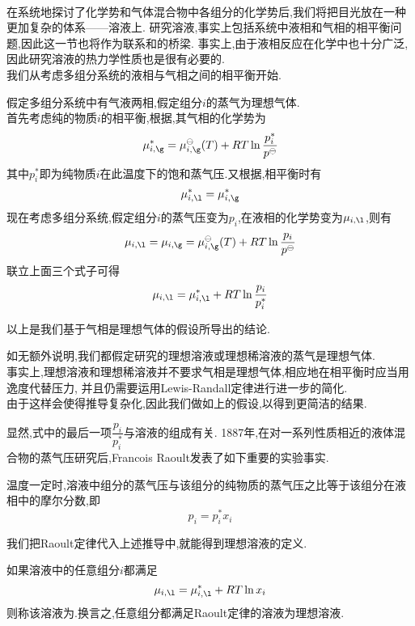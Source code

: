 \documentclass{ctexart}
\begin{document}
\pagestyle{plain}
\noindent{}\vspace{15pt}\\
\indent 在系统地探讨了化学势和气体混合物中各组分的化学势后,我们将把目光放在一种更加复杂的体系——溶液上.%
研究溶液,事实上包括系统中液相和气相的相平衡问题,因此这一节也将作为联系和的桥梁.%
事实上,由于液相反应在化学中也十分广泛,因此研究溶液的热力学性质也是很有必要的.\vspace{12pt}\\
\indent 我们从考虑多组分系统的液相与气相之间的相平衡开始.
\begin{derivation}
    假定多组分系统中有气液两相,假定组分$i$的蒸气为理想气体.\\
    首先考虑纯的物质$i$的相平衡,根据,其气相的化学势为
    \[\mu_{i,\g}^\ast=\mu_{i,\g}^\ominus(T)+RT\ln\dfrac{p_i^\ast}{p^\ominus}\]
    其中$p_i^\ast$即为纯物质$i$在此温度下的饱和蒸气压.又根据,相平衡时有
    \[\mu_{i,\l}^\ast=\mu_{i,\g}^\ast\]
    现在考虑多组分系统,假定组分$i$的蒸气压变为$p_i$,在液相的化学势变为$\mu_{i,\l}$,则有
    \[\mu_{i,\l}=\mu_{i,\g}=\mu_{i,\g}^\ominus(T)+RT\ln\dfrac{p_i}{p^\ominus}\]
    联立上面三个式子可得
    \[\mu_{i,\l}=\mu_{i,\l}^\ast+RT\ln\dfrac{p_i}{p_i^\ast}\]
    
\end{derivation}
以上是我们基于气相是理想气体的假设所导出的结论.
\begin{hint}
    如无额外说明,我们都假定研究的理想溶液或理想稀溶液的蒸气是理想气体.\\
    事实上,理想溶液和理想稀溶液并不要求气相是理想气体,相应地在相平衡时应当用逸度代替压力,%
    并且仍需要运用Lewis-Randall定律进行进一步的简化.\\
    由于这样会使得推导复杂化,因此我们做如上的假设,以得到更简洁的结果.
\end{hint}
显然,式中的最后一项$\dfrac{p_i}{p_i^\ast}$与溶液的组成有关.%
1887年,在对一系列性质相近的液体混合物的蒸气压研究后,Francois Raoult发表了如下重要的实验事实.
\begin{theorem}[4C.1.1 Raoult定律]
    温度一定时,溶液中组分的蒸气压与该组分的纯物质的蒸气压之比等于该组分在液相中的摩尔分数,即
    \[p_i=p_i^\ast x_i\]

\end{theorem}
我们把Raoult定律代入上述推导中,就能得到理想溶液的定义.
\begin{definition}[4C.1.2 理想溶液]
    如果溶液中的任意组分$i$都满足
    \[\mu_{i,\l}=\mu_{i,\l}^\ast+RT\ln x_i\]
    则称该溶液为.换言之,任意组分都满足Raoult定律的溶液为理想溶液.
\end{definition}
\end{document}
